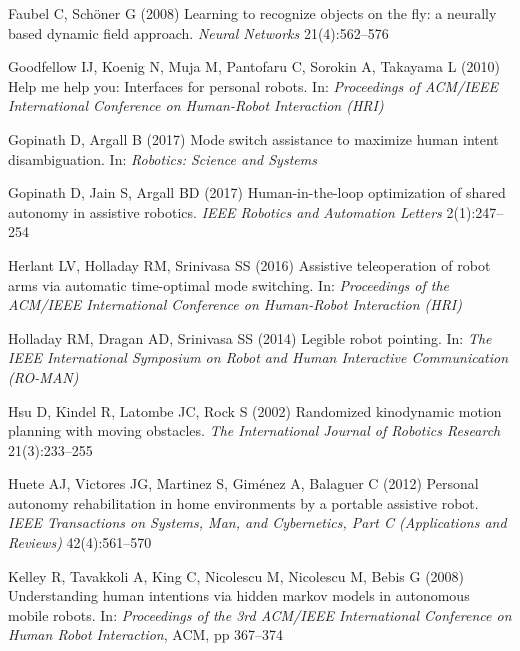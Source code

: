\documentclass[natbib, twocolumn]{svjour3}          %
\begin{document}
\begin{thebibliography}{54}
	Faubel C, Sch{\"o}ner G (2008) Learning to recognize objects on the fly: a
	neurally based dynamic field approach. \textit{Neural Networks}
	21(4):562--576
	
	Goodfellow IJ, Koenig N, Muja M, Pantofaru C, Sorokin A, Takayama L (2010) Help
	me help you: Interfaces for personal robots. In: \textit{Proceedings of
		ACM/IEEE International Conference on Human-Robot Interaction (HRI)}
	
	Gopinath D, Argall B (2017) Mode switch assistance to maximize human intent
	disambiguation. In: \textit{Robotics: Science and Systems}
	
	Gopinath D, Jain S, Argall BD (2017) Human-in-the-loop optimization of shared
	autonomy in assistive robotics. \textit{IEEE Robotics and Automation Letters}
	2(1):247--254
	
	Herlant LV, Holladay RM, Srinivasa SS (2016) Assistive teleoperation of robot
	arms via automatic time-optimal mode switching. In: \textit{Proceedings of
		the ACM/IEEE International Conference on Human-Robot Interaction (HRI)}
	
	Holladay RM, Dragan AD, Srinivasa SS (2014) Legible robot pointing. In:
	\textit{The IEEE International Symposium on Robot and Human Interactive
		Communication (RO-MAN)}
	
	Hsu D, Kindel R, Latombe JC, Rock S (2002) Randomized kinodynamic motion
	planning with moving obstacles. \textit{The International Journal of Robotics
		Research} 21(3):233--255
	
	Huete AJ, Victores JG, Martinez S, Gim{\'e}nez A, Balaguer C (2012) Personal
	autonomy rehabilitation in home environments by a portable assistive robot.
	\textit{IEEE Transactions on Systems, Man, and Cybernetics, Part C
		(Applications and Reviews)} 42(4):561--570
	
	Kelley R, Tavakkoli A, King C, Nicolescu M, Nicolescu M, Bebis G (2008)
	Understanding human intentions via hidden markov models in autonomous mobile
	robots. In: \textit{Proceedings of the 3rd ACM/IEEE International Conference
		on Human Robot Interaction}, ACM, pp 367--374
	

\end{thebibliography}
\end{document}
